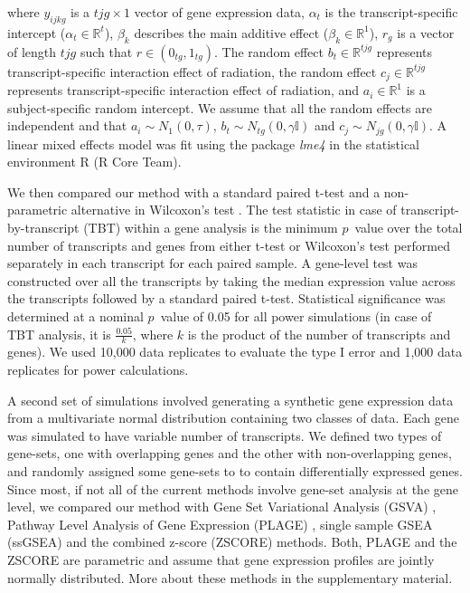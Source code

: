 \documentclass[hidelinks,11pt]{article}
\begin{document}
where $y_{ijkg}$ is a $tjg \times 1$ vector of gene expression data, $\alpha_t$ is the transcript-specific intercept ($\alpha_t \in \mathbb{R}^t$), $\beta_k$ describes the main additive effect ($\beta_k \in \mathbb{R}^1$), $r_g$ is a vector of length $tjg$ such that $r \in \left(0_{tg},1_{tg}\right)$. The random effect $b_t \in \mathbb{R}^{tjg}$ represents transcript-specific interaction effect of radiation, the random effect $c_j \in \mathbb{R}^{tjg}$ represents transcript-specific interaction effect of radiation, and $a_i \in \mathbb{R}^1$ is a subject-specific random intercept. We assume that all the random effects are independent and that $a_i \sim N_1 \left(0, \tau \right)$, $b_t \sim N_{tg} \left(0, \gamma\mathbb{I} \right)$ and $c_j \sim N_{jg} \left(0, \gamma\mathbb{I} \right)$. A linear mixed effects model was fit using the package \emph{lme4}\cite{lme4} in the statistical environment R (R Core Team). 

We then compared our method with a standard paired t-test and a non-parametric alternative in Wilcoxon's test \cite{wilcoxon}. The test statistic in case of transcript-by-transcript (TBT) within a gene analysis is the minimum $p$~value over the total number of transcripts and genes from either t-test or Wilcoxon's test performed separately in each transcript for each paired sample. A gene-level test was constructed over all the transcripts by taking the median expression value across the transcripts followed by a standard paired t-test. Statistical significance was determined at a nominal $p$~value of 0.05 for all power simulations (in case of TBT analysis, it is $\frac{0.05}{k}$,  where $k$ is the product of the number of transcripts and genes). We used 10,000 data replicates to evaluate the type I error and 1,000 data replicates for power calculations. 

A second set of simulations involved generating a synthetic gene expression data from a multivariate normal distribution containing two classes of data. Each gene was simulated to have variable number of transcripts. We defined two types of gene-sets, one with overlapping genes and the other with non-overlapping genes, and randomly assigned some gene-sets to to contain differentially expressed genes. Since most, if not all of the current methods involve gene-set analysis at the gene level, we compared our method with Gene Set Variational Analysis (GSVA) \cite{gsva}, Pathway Level Analysis of Gene Expression (PLAGE) \cite{plage}, single sample GSEA (ssGSEA) \cite{ssgsea} and the combined z-score (ZSCORE) \cite{zscore} methods. Both, PLAGE and the ZSCORE are parametric and assume that gene expression profiles are jointly normally distributed. More about these methods in the supplementary material. 
\end{document}
